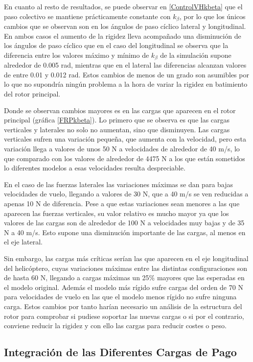 En cuanto al resto de resultados, se puede observar en \ref{ControlVHkbeta} que el paso colectivo se mantiene prácticamente constante con $k_\beta$, por lo que los únicos cambios que se observan son en los ángulos de paso cíclico lateral y longitudinal. En ambos casos el aumento de la rigidez lleva acompañado una disminución de los ángulos de paso cíclico que en el caso del longitudinal se observa que la diferencia entre los valores máximo y mínimo de $k_\beta$ de la simulación supone alrededor de 0.005 rad, mientras que en el lateral las diferencias alcanzan valores de entre 0.01 y 0.012 rad. Estos cambios de menos de un grado son asumibles por lo que no supondría ningún problema a la hora de variar la rigidez en batimiento del rotor principal.

Donde se observan cambios mayores es en las cargas que aparecen en el rotor principal (gráfica \ref{FRPkbeta}). Lo primero que se observa es que las cargas verticales y laterales no solo no aumentan, sino que disminuyen. Las cargas verticales sufren una variación pequeña, que aumenta con la velocidad, pero esta variación llega a valores de unos 50 N a velocidades de alrededor de 40 m/s, lo que comparado con los valores de alrededor de 4475 N a los que están sometidos lo diferentes modelos a esas velocidades resulta despreciable.

En el caso de las fuerzas laterales las variaciones máximas se dan para bajas velocidades de vuelo, llegando a valores de 30 N, que a 40 m/s se ven reducidas a apenas 10 N de diferencia. Pese a que estas variaciones sean menores a las que aparecen las fuerzas verticales, su valor relativo es mucho mayor ya que los valores de las cargas son de alrededor de 100 N a velocidades muy bajas y de 35 N a 40 m/s. Esto supone una disminución importante de las cargas, al menos en el eje lateral.

Sin embargo, las cargas más críticas serían las que aparecen en el eje longitudinal del helicóptero, cuyas variaciones máximas entre las distintas configuraciones son de hasta 60 N, llegando a cargas máximas un 25\% mayores que las esperadas en el modelo original. Además el modelo más rígido sufre cargas del orden de 70 N para velocidades de vuelo en las que el modelo menos rígido no sufre ninguna carga. Estos cambios por tanto harían necesario un análisis de la estructura del rotor para comprobar si pudiese soportar las nuevas cargas o si por el contrario, conviene reducir la rigidez y con ello las cargas para reducir costes o peso.

\subsection{Integración de las Diferentes Cargas de Pago}

